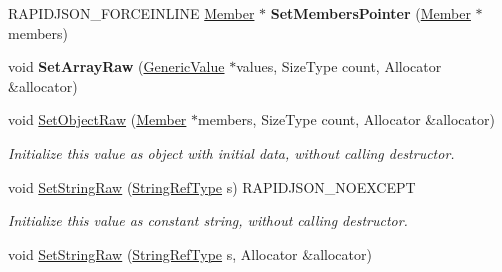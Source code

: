 \begin{DoxyCompactItemize}
\item 
R\+A\+P\+I\+D\+J\+S\+O\+N\+\_\+\+F\+O\+R\+C\+E\+I\+N\+L\+I\+NE \hyperlink{class_generic_value_a7ccf27c44058b4c11c3efc6473afb886}{Member} $\ast$ {\bfseries Set\+Members\+Pointer} (\hyperlink{class_generic_value_a7ccf27c44058b4c11c3efc6473afb886}{Member} $\ast$members)\hypertarget{class_generic_value_a0b488cb0120b154eadde27dc0e694019}{}\label{class_generic_value_a0b488cb0120b154eadde27dc0e694019}

\item 
void {\bfseries Set\+Array\+Raw} (\hyperlink{class_generic_value}{Generic\+Value} $\ast$values, Size\+Type count, Allocator \&allocator)\hypertarget{class_generic_value_a8f5f309065479de40a16cf28a340da65}{}\label{class_generic_value_a8f5f309065479de40a16cf28a340da65}

\item 
void \hyperlink{class_generic_value_a26c8ec7d68858df1038506df7fcff22d}{Set\+Object\+Raw} (\hyperlink{class_generic_value_a7ccf27c44058b4c11c3efc6473afb886}{Member} $\ast$members, Size\+Type count, Allocator \&allocator)\hypertarget{class_generic_value_a26c8ec7d68858df1038506df7fcff22d}{}\label{class_generic_value_a26c8ec7d68858df1038506df7fcff22d}

\begin{DoxyCompactList}\small\item\em Initialize this value as object with initial data, without calling destructor. \end{DoxyCompactList}\item 
void \hyperlink{class_generic_value_a1451603922dcdf34976f125dc60f70ee}{Set\+String\+Raw} (\hyperlink{class_generic_value_a32e0f30ee278072374c8168b14d3317f}{String\+Ref\+Type} s) R\+A\+P\+I\+D\+J\+S\+O\+N\+\_\+\+N\+O\+E\+X\+C\+E\+PT\hypertarget{class_generic_value_a1451603922dcdf34976f125dc60f70ee}{}\label{class_generic_value_a1451603922dcdf34976f125dc60f70ee}

\begin{DoxyCompactList}\small\item\em Initialize this value as constant string, without calling destructor. \end{DoxyCompactList}\item 
void \hyperlink{class_generic_value_ad3d91db36dfdbfc1af40a79aae07723c}{Set\+String\+Raw} (\hyperlink{class_generic_value_a32e0f30ee278072374c8168b14d3317f}{String\+Ref\+Type} s, Allocator \&allocator)\hypertarget{class_generic_value_ad3d91db36dfdbfc1af40a79aae07723c}{}\label{class_generic_value_ad3d91db36dfdbfc1af40a79aae07723c}


\end{DoxyCompactItemize}
